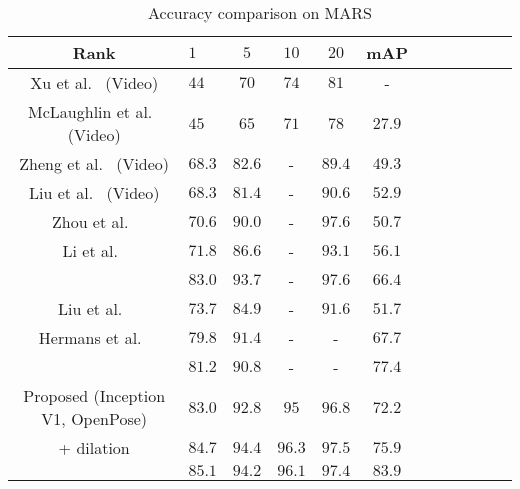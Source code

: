 \documentclass{llncs}
\begin{document}
\begin{table}[t]
\setlength{\tabcolsep}{5pt}
\centering
\caption{\small Accuracy comparison on MARS}\vspace{-.3cm}
\label{table:result_mars}
\resizebox{0.70\linewidth}{!}
{
\begin{tabular}[pos]{|Sl| |Sc|Sc|Sc|Sc|Sc|}
\hline
Rank & $1$ & $5$ & $10$ & $20$ & mAP\\
\hline\hline
Xu et al.~\cite{conf/iccv/xu17} (Video) & $44$ & $70$ & $74$ & $81$ & - \\
McLaughlin et al.~\cite{conf/cvpr/mclaughlin16} (Video) & $45$ & $65$ & $71$ & $78$ & $27.9$\\
Zheng et al.~\cite{ZhengBSWSWT16} (Video) & $68.3$ & $82.6$ & - & $89.4$ & $49.3$\\
Liu et al.~\cite{journal/arxiv/liu17} (Video) & $68.3$ & $81.4$ & - & $90.6$ & $52.9$\\
Zhou et al.~\cite{conf/cvpr/zhou17} & $70.6$ & $90.0$ & - & $97.6$ & $50.7$ \\
Li et al.~\cite{conf/cvpr/li17} & $71.8$ & $86.6$ & - & $93.1$ & $56.1$\\
\quad{} & {\color{blue}$83.0$} & {\color{blue}$93.7$} & {\color{blue}-} & {\color{blue}$97.6$} & {\color{blue}$66.4$}\\
Liu et al.~\cite{conf/cvpr/liu17} & $73.7$ & $84.9$ & - & $91.6$ & $51.7$\\
Hermans et al.~\cite{journal/arxiv/hermans17}& $79.8$ & $91.4$ & - & - & $67.7$\\
\quad{} & {\color{blue}$81.2$} & {\color{blue}$90.8$} & {\color{blue}-} & {\color{blue}-} & {\color{blue}$77.4$} \\
\hline
Proposed (Inception V1, OpenPose)  & $83.0$ & $92.8$ & $95$ & $96.8$ & $72.2$  \\
\quad\quad + dilation& $\mathbf{84.7}$ & $\mathbf{94.4}$ & $\mathbf{96.3}$ & $\mathbf{97.5}$ & $\mathbf{75.9}$ \\
\quad{} & {\color{blue}$\mathbf{85.1}$} & {\color{blue}$\mathbf{94.2}$} & {\color{blue}$\mathbf{96.1}$} & {\color{blue}$\mathbf{97.4}$} &  {\color{blue}$\mathbf{83.9}$} \\
\hline
\end{tabular}}\vspace{-.5cm}
\end{table}
\end{document}
